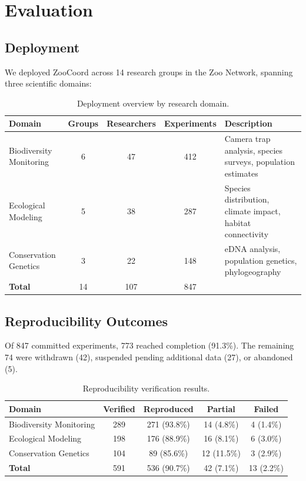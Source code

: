\section{Evaluation}

\label{sec:evaluation}

\subsection{Deployment}

We deployed ZooCoord across 14 research groups in the Zoo Network, spanning three scientific domains:

\begin{table}[H]
\centering
\caption{Deployment overview by research domain.}
\label{tab:deployment}
\begin{tabularx}{\textwidth}{@{}lcccX@{}}
\toprule
\textbf{Domain} & \textbf{Groups} & \textbf{Researchers} & \textbf{Experiments} & \textbf{Description} \\
\midrule
Biodiversity Monitoring & 6 & 47 & 412 & Camera trap analysis, species surveys, population estimates \\
Ecological Modeling & 5 & 38 & 287 & Species distribution, climate impact, habitat connectivity \\
Conservation Genetics & 3 & 22 & 148 & eDNA analysis, population genetics, phylogeography \\
\midrule
\textbf{Total} & 14 & 107 & 847 & \\
\bottomrule
\end{tabularx}
\end{table}

\subsection{Reproducibility Outcomes}

Of 847 committed experiments, 773 reached completion (91.3\%).
The remaining 74 were withdrawn (42), suspended pending additional data (27), or abandoned (5).

\begin{table}[H]
\centering
\caption{Reproducibility verification results.}
\label{tab:reproducibility}
\begin{tabular}{@{}lcccc@{}}
\toprule
\textbf{Domain} & \textbf{Verified} & \textbf{Reproduced} & \textbf{Partial} & \textbf{Failed} \\
\midrule
Biodiversity Monitoring & 289 & 271 (93.8\%) & 14 (4.8\%) & 4 (1.4\%) \\
Ecological Modeling & 198 & 176 (88.9\%) & 16 (8.1\%) & 6 (3.0\%) \\
Conservation Genetics & 104 & 89 (85.6\%) & 12 (11.5\%) & 3 (2.9\%) \\
\midrule
\textbf{Total} & 591 & 536 (90.7\%) & 42 (7.1\%) & 13 (2.2\%) \\
\bottomrule
\end{tabular}
\end{table}


